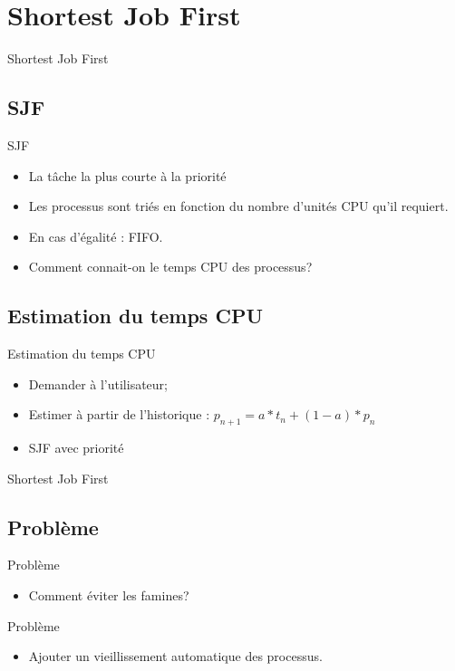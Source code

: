 \def\sectitle{Shortest Job First}
\section{\sectitle}

\begin{frame}{\sectitle}
\def\subsectitle{SJF}
\subsection{\subsectitle}

\begin{block}{\subsectitle}
\begin{itemize}
    \item La tâche la plus courte à la priorité
    \item Les processus sont triés en fonction du nombre d'unités CPU qu'il
    requiert.
    \item En cas d'égalité : FIFO.
    \item Comment connait-on le temps CPU des processus?
\end{itemize}
\end{block}


\def\subsectitle{Estimation du temps CPU}
\subsection{\subsectitle}

\begin{block}{\subsectitle}
\begin{itemize}
    \item Demander à l'utilisateur;
    \item Estimer à partir de l'historique : $p_{n+1} = a*t_{n}+(1-a)*p_{n}$
    \item SJF avec priorité
\end{itemize}
\end{block}
\end{frame}

\begin{frame}{\sectitle}
\def\subsectitle{Problème}
\subsection{\subsectitle}

\begin{alertblock}{\subsectitle}
\begin{itemize}
    \item Comment éviter les famines?
\end{itemize}
\end{alertblock}


\begin{exampleblock}{\subsectitle}
\begin{itemize}
    \item Ajouter un vieillissement automatique des processus.
\end{itemize}
\end{exampleblock}
\end{frame}


